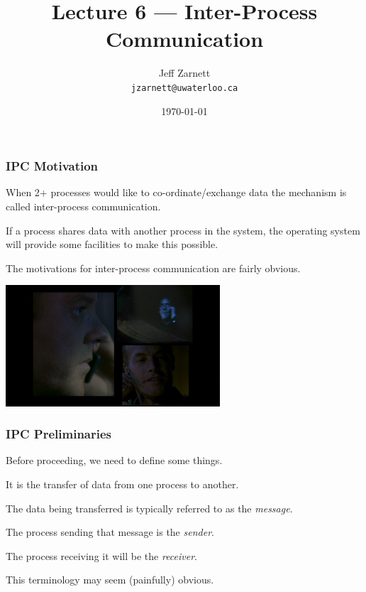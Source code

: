 

\title{Lecture 6 --- Inter-Process Communication}

\author{Jeff Zarnett \\ \small \texttt{jzarnett@uwaterloo.ca}}
\date{\today}




\begin{frame}
	\titlepage

\end{frame}

\begin{frame}
	\frametitle{IPC Motivation}

	When 2+ processes would like to co-ordinate/exchange data the mechanism is called \alert{inter-process communication}.

	If a process shares data with another process in the system, the operating system will provide some facilities to make this possible.

	The motivations for inter-process communication are fairly obvious.

	\begin{center}
		\includegraphics[width=0.6\textwidth]{images/24-splitscreen.jpg}
	\end{center}

\end{frame}


\begin{frame}
	\frametitle{IPC Preliminaries}

	Before proceeding, we need to define some things.

	It is the transfer of data from one process to another.

	The data being transferred is typically referred to as the \textit{message}.

	The process sending that message is the \textit{sender}.

	The process receiving it will be the \textit{receiver}.

	This terminology may seem (painfully) obvious.

\end{frame}


